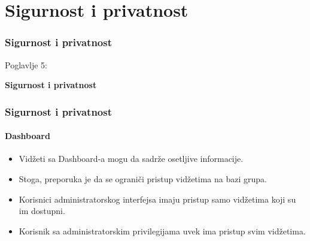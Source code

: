 %

\section{Sigurnost i privatnost}
\begin{frame}[fragile]
	\frametitle{Sigurnost i privatnost}

	\begin{center}\huge{Poglavlje 5:}\end{center}
	\begin{center}\huge{\color{typo3darkgrey}\textbf{Sigurnost i privatnost}}\end{center}

\end{frame}


\begin{frame}[fragile]
	\frametitle{Sigurnost i privatnost}
	\framesubtitle{Dashboard}

	\begin{itemize}
		\item Vidžeti sa Dashboard-a mogu da sadrže osetljive informacije.
		\item Stoga, preporuka je da se ograniči pristup vidžetima na bazi grupa.
		\item Korisnici administratorskog interfejsa imaju pristup samo vidžetima koji su im dostupni.
		\item Korisnik sa administratorskim privilegijama uvek ima pristup svim vidžetima.
	\end{itemize}

\end{frame}


